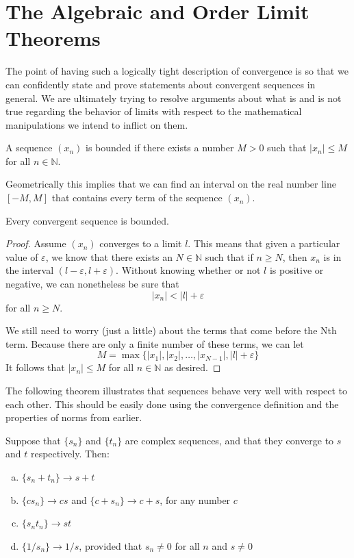 \section{The Algebraic and Order Limit Theorems}

The point of having such a logically tight description of convergence is so that we can confidently state and prove statements about convergent sequences in general.  We are ultimately trying to resolve arguments about what is and is not true regarding the behavior of limits with respect to the mathematical manipulations we intend to inflict on them.

\begin{definition} A sequence $(x_{n})$ is bounded if there exists a number $M>0$ such that $|x_{n}|\leq M$ for all $n \in \mathbb{N}$. \end{definition}

Geometrically this implies that we can find an interval on the real number line $[-M, M]$ that contains every term of the sequence $(x_{n})$.

\begin{theorem} Every convergent sequence is bounded. \end{theorem}

\begin{proof}
Assume $(x_{n})$ converges to a limit $l$. This means that given a particular value of $\varepsilon$, we know that there exists an $N \in \mathbb{N}$ such that if $n\geq N$, then $x_{n}$ is in the interval $(l-\varepsilon, l+\varepsilon)$.  Without knowing whether or not $l$ is positive or negative, we can nonetheless be sure that   $$ |x_{n}| < |l| + \varepsilon $$ for all $n\geq N$.

We still need to worry (just a little) about the terms that come before the Nth term.  Because there are only a finite number of these terms, we can let $$ M = \max \{|x_{1}|,|x_{2}|, \ldots, |x_{N-1}|,|l|+\varepsilon \}$$
It follows that $|x_{n}|\leq M$ for all $n \in \mathbb{N}$ as desired.
\end{proof}

The following theorem  illustrates that sequences behave very well with respect to each other.  This should be easily done using the convergence definition and the properties of norms from earlier.

\begin{theorem} Suppose that $\{s_n\}$ and $\{t_n\}$ are complex sequences, and that they converge to $s$ and $t$ respectively.  Then:
\begin{enumerate}[(a)]
	\item $\{s_n + t_n\} \to s+t$
	\item $\{cs_n\} \to cs$ and $\{c+s_n\} \to c+s$, for any number $c$
	\item $\{s_n t_n\} \to st$
	\item $\{1/s_n\} \to 1/s$, provided that $s_n \neq 0$ for all $n$ and $s \neq 0$
\end{enumerate}
\end{theorem}

